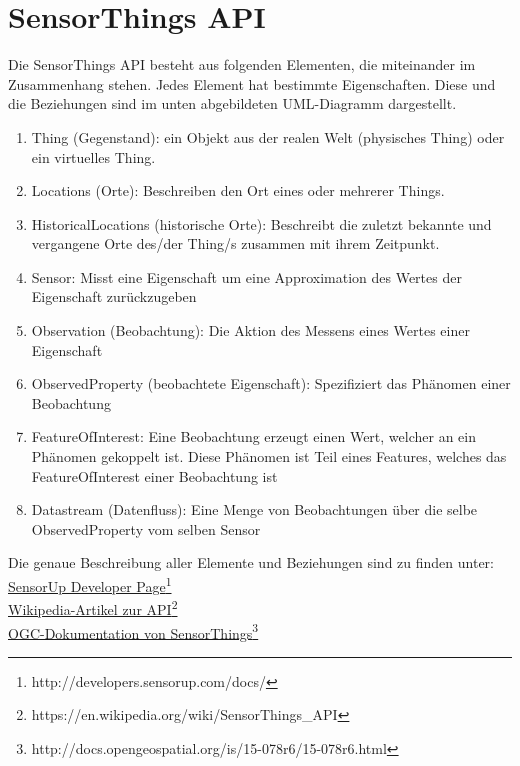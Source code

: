 \documentclass[a4paper, 12 pt]{article}
\begin{document}
\newpage
	\section{SensorThings API}

	Die SensorThings API besteht aus folgenden Elementen, die miteinander im Zusammenhang stehen. Jedes Element hat bestimmte Eigenschaften. Diese und die Beziehungen sind im unten abgebildeten UML-Diagramm dargestellt. \\
	\begin{enumerate}
	
	\item Thing (Gegenstand): ein Objekt aus der realen Welt (physisches Thing) oder ein virtuelles Thing.
	\item Locations (Orte): Beschreiben den Ort eines oder mehrerer Things.
	\item HistoricalLocations (historische Orte): Beschreibt die zuletzt bekannte und vergangene Orte des/der Thing/s zusammen mit ihrem Zeitpunkt.
	\item Sensor: Misst eine Eigenschaft um eine Approximation des Wertes der Eigenschaft zurückzugeben
	\item Observation (Beobachtung): Die Aktion des Messens eines Wertes einer Eigenschaft
	\item ObservedProperty (beobachtete Eigenschaft): Spezifiziert das Phänomen einer Beobachtung
	\item FeatureOfInterest: Eine Beobachtung erzeugt einen Wert, welcher an ein Phänomen gekoppelt ist. Diese Phänomen ist Teil eines Features, welches das FeatureOfInterest einer Beobachtung ist
	\item Datastream (Datenfluss): Eine Menge von Beobachtungen über die selbe ObservedProperty vom selben Sensor   
	\end{enumerate}
	Die genaue Beschreibung aller Elemente und Beziehungen sind zu finden unter: \\
	\href{http://developers.sensorup.com/docs/}{SensorUp Developer Page}\footnote{http://developers.sensorup.com/docs/}\\
	\href{https://en.wikipedia.org/wiki/SensorThings_API}{Wikipedia-Artikel zur API}\footnote{https://en.wikipedia.org/wiki/SensorThings\_API}\\
	\href{http://docs.opengeospatial.org/is/15-078r6/15-078r6.html}{OGC-Dokumentation von SensorThings}\footnote{http://docs.opengeospatial.org/is/15-078r6/15-078r6.html}\\
\end{document}
